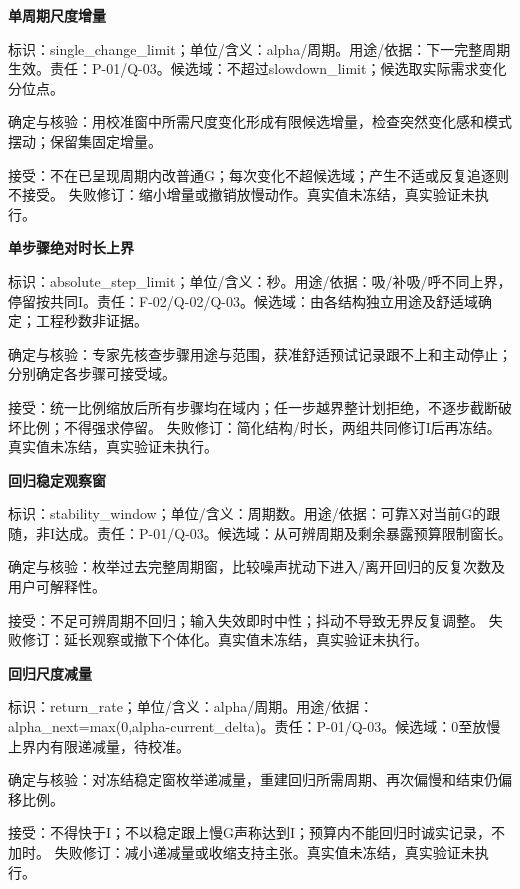 \documentclass[11pt,a4paper]{article}
\newcommand{\reviewsubsection}[1]{\par\Needspace{4\baselineskip}\begin{center}{\titlelatin\titlecjk\bfseries\fontsize{12}{18}\selectfont #1}\end{center}}
\begin{document}
\begin{minipage}{\linewidth}
\reviewsubsection{8.7 单周期尺度增量}
标识：single\_\allowbreak{}change\_\allowbreak{}limit；单位/\allowbreak{}含义：alpha/\allowbreak{}周期。用途/\allowbreak{}依据：下一完整周期生效。责任：P-\allowbreak{}01/\allowbreak{}Q-\allowbreak{}03。候选域：不超过slowdown\_\allowbreak{}limit；候选取实际需求变化分位点。

确定与核验：用校准窗中所需尺度变化形成有限候选增量，检查突然变化感和模式摆动；保留集固定增量。

接受：不在已呈现周期内改普通G；每次变化不超候选域；产生不适或反复追逐则不接受。 失败修订：缩小增量或撤销放慢动作。真实值未冻结，真实验证未执行。
\end{minipage}\par

\begin{minipage}{\linewidth}
\reviewsubsection{8.8 单步骤绝对时长上界}
标识：absolute\_\allowbreak{}step\_\allowbreak{}limit；单位/\allowbreak{}含义：秒。用途/\allowbreak{}依据：吸/\allowbreak{}补吸/\allowbreak{}呼不同上界，停留按共同I。责任：F-\allowbreak{}02/\allowbreak{}Q-\allowbreak{}02/\allowbreak{}Q-\allowbreak{}03。候选域：由各结构独立用途及舒适域确定；工程秒数非证据。

确定与核验：专家先核查步骤用途与范围，获准舒适预试记录跟不上和主动停止；分别确定各步骤可接受域。

接受：统一比例缩放后所有步骤均在域内；任一步越界整计划拒绝，不逐步截断破坏比例；不得强求停留。 失败修订：简化结构/\allowbreak{}时长，两组共同修订I后再冻结。真实值未冻结，真实验证未执行。
\end{minipage}\par

\begin{minipage}{\linewidth}
\reviewsubsection{8.9 回归稳定观察窗}
标识：stability\_\allowbreak{}window；单位/\allowbreak{}含义：周期数。用途/\allowbreak{}依据：可靠X对当前G的跟随，非I达成。责任：P-\allowbreak{}01/\allowbreak{}Q-\allowbreak{}03。候选域：从可辨周期及剩余暴露预算限制窗长。

确定与核验：枚举过去完整周期窗，比较噪声扰动下进入/\allowbreak{}离开回归的反复次数及用户可解释性。

接受：不足可辨周期不回归；输入失效即时中性；抖动不导致无界反复调整。 失败修订：延长观察或撤下个体化。真实值未冻结，真实验证未执行。
\end{minipage}\par

\begin{minipage}{\linewidth}
\reviewsubsection{8.10 回归尺度减量}
标识：return\_\allowbreak{}rate；单位/\allowbreak{}含义：alpha/\allowbreak{}周期。用途/\allowbreak{}依据：alpha\_\allowbreak{}next=max(0,alpha-\allowbreak{}current\_\allowbreak{}delta)。责任：P-\allowbreak{}01/\allowbreak{}Q-\allowbreak{}03。候选域：0至放慢上界内有限递减量，待校准。

确定与核验：对冻结稳定窗枚举递减量，重建回归所需周期、再次偏慢和结束仍偏移比例。

接受：不得快于I；不以稳定跟上慢G声称达到I；预算内不能回归时诚实记录，不加时。 失败修订：减小递减量或收缩支持主张。真实值未冻结，真实验证未执行。
\end{minipage}\par
\end{document}

